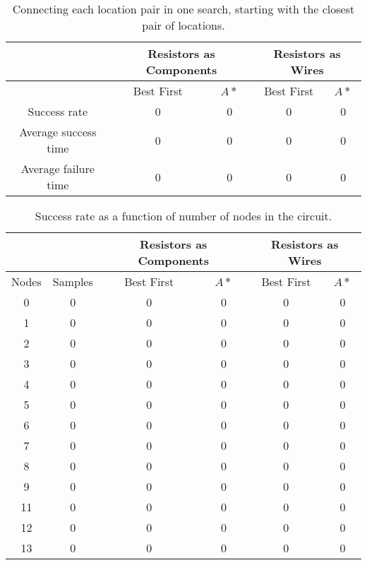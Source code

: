 \begin{table}[H]
\begin{center}
\begin{singlespace}
\begin{tabular}{| c || c | c | c | c |}
\hline
 & \multicolumn{2}{|c|}{Resistors as Components} & \multicolumn{2}{|c|}{
 Resistors as Wires} \\
\hline
 & Best First & $A*$ & Best First & $A*$ \\
\hline\hline
Success rate & 0 & 0 & 0 & 0 \\
Average success time & 0 & 0 & 0 & 0 \\
Average failure time & 0 & 0 & 0 & 0 \\
\hline
\end{tabular}
\end{singlespace}
\end{center}
\caption{Connecting each location pair in one search, starting with the closest
pair of locations.}
\end{table}

\begin{table}[H]
\begin{center}
\begin{singlespace}
\begin{tabular}{| c | c || c | c | c | c |}
\hline
 & & \multicolumn{2}{|c|}{Resistors as Components} & \multicolumn{2}{|c|}{
 Resistors as Wires} \\
\hline
Nodes & Samples & Best First & $A*$ & Best First & $A*$ \\
\hline\hline
0 & 0 & 0 & 0 & 0 & 0 \\
1 & 0 & 0 & 0 & 0 & 0 \\
2 & 0 & 0 & 0 & 0 & 0 \\
3 & 0 & 0 & 0 & 0 & 0 \\
4 & 0 & 0 & 0 & 0 & 0 \\
5 & 0 & 0 & 0 & 0 & 0 \\
6 & 0 & 0 & 0 & 0 & 0 \\
7 & 0 & 0 & 0 & 0 & 0 \\
8 & 0 & 0 & 0 & 0 & 0 \\
9 & 0 & 0 & 0 & 0 & 0 \\
11 & 0 & 0 & 0 & 0 & 0 \\
12 & 0 & 0 & 0 & 0 & 0 \\
13 & 0 & 0 & 0 & 0 & 0 \\
\hline
\end{tabular}
\end{singlespace}
\end{center}
\caption{Success rate as a function of number of nodes in the circuit.}
\end{table}

